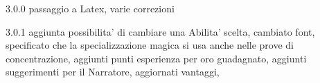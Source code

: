 \documentclass[a4paper,11pt,twoside,openany]{dndbook}
\begin{document}
{3.0.0 passaggio a Latex, varie correzioni

3.0.1 aggiunta possibilita' di cambiare una Abilita' scelta, cambiato font, specificato che la specializzazione magica si usa anche nelle prove di concentrazione, aggiunti punti esperienza per oro guadagnato, aggiunti suggerimenti per il Narratore, aggiornati vantaggi, 
}
\end{document}
